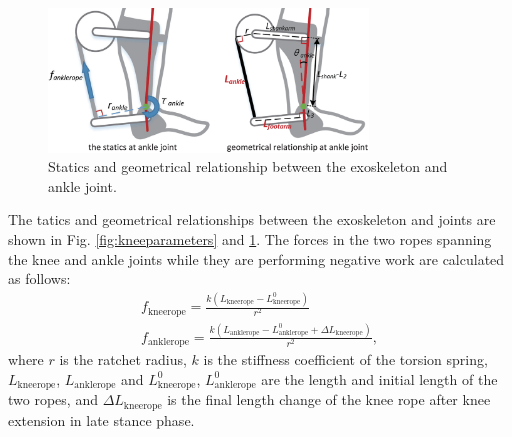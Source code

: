 \documentclass[twocolumn,cleanfoot,10pt]{asme2ej}
\begin{document}
\begin{figure}[t]
	\centering
	\includegraphics[width=8.5cm]{ankleparameters.eps}
	\caption{Statics and geometrical relationship between the exoskeleton and ankle joint.}
	\label{fig:ankleparameters}
\end{figure}


The tatics and geometrical relationships between the exoskeleton and joints are shown in Fig. \ref{fig:kneeparameters} and \ref{fig:ankleparameters}.
The forces in the two ropes spanning the knee and ankle joints while they are performing negative work are calculated as follows:
\begin{gather}
	f_\mathrm{kneerope} = \frac{k(L_\mathrm{kneerope}-L_\mathrm{kneerope}^0)}{r^2} \\
	f_\mathrm{anklerope} = \frac{k(L_\mathrm{anklerope}-L_\mathrm{anklerope}^0+\Delta L_\mathrm{kneerope})}{r^2},
\end{gather}
where $r$ is the ratchet radius, $k$ is the stiffness coefficient of the torsion spring, $L_\mathrm{kneerope}$, $L_\mathrm{anklerope}$ and $L_\mathrm{kneerope}^0$, $L_\mathrm{anklerope}^0$ are the length and initial length of the two ropes, and $\Delta L_\mathrm{kneerope}$ is the final length change of the knee rope after knee extension in late stance phase.
\end{document}
